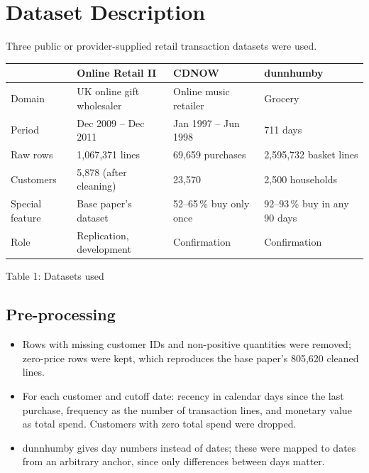 \documentclass[11pt,a4paper]{article}
\begin{document}
\newpage
\section{Dataset Description}

Three public or provider-supplied retail transaction datasets were used.

\begin{center}
\small
\begin{tabularx}{\textwidth}{@{}lXXX@{}}
\toprule
 & \textbf{Online Retail II} \cite{chen2019uci} & \textbf{CDNOW} \cite{fader2005} & \textbf{dunnhumby} \cite{dunnhumby} \\
\midrule
Domain & UK online gift wholesaler & Online music retailer & Grocery \\
Period & Dec 2009 -- Dec 2011 & Jan 1997 -- Jun 1998 & 711 days \\
Raw rows & 1,067,371 lines & 69,659 purchases & 2,595,732 basket lines \\
Customers & 5,878 (after cleaning) & 23,570 & 2,500 households \\
Special feature & Base paper's dataset & 52--65\,\% buy only once & 92--93\,\% buy in any 90 days \\
Role & Replication, development & Confirmation & Confirmation \\
\bottomrule
\end{tabularx}\par
\vspace{4pt}Table 1: Datasets used
\end{center}

\subsection{Pre-processing}
\begin{itemize}
\item Rows with missing customer IDs and non-positive quantities were removed; zero-price rows were kept, which reproduces the base paper's 805,620 cleaned lines.
\item For each customer and cutoff date: recency in calendar days since the last purchase, frequency as the number of transaction lines, and monetary value as total spend. Customers with zero total spend were dropped.
\item dunnhumby gives day numbers instead of dates; these were mapped to dates from an arbitrary anchor, since only differences between days matter.
\end{itemize}
\end{document}

